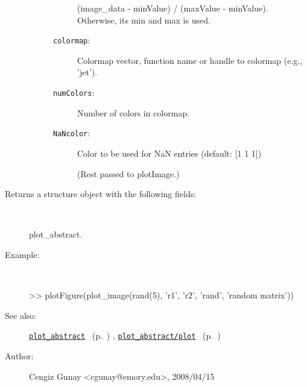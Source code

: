 \begin{description}
\begin{description}
\begin{description}
(image\_data - minValue) / (maxValue - minValue). 
Otherwise, its min and max is used.
\item[\texttt{colormap}:]
 Colormap vector, function name or handle to colormap (e.g., 'jet').
\item[\texttt{numColors}:]
 Number of colors in colormap.
\item[\texttt{NaNcolor}:]
 Color to be used for NaN entries (default: [1 1 1])

(Rest passed to plotImage.)
\end{description}%
\end{description}%
%
\item[Returns a structure object with the following fields:
]~

	plot\_abstract.
%
\item[Example:]~
\begin{lyxcode} >> plotFigure(plot\_image(rand(5), {'r1', 'r2'}, 'rand', 'random matrix'))
\\%
\end{lyxcode}
%
\item[See also:]%
\hyperlink{ref_plot_abstract}{\texttt{plot\_abstract}}%
\ (p.~\pageref{ref_plot_abstract})%
%
, \hyperlink{ref_plot_abstract__plot}{\texttt{plot\_abstract/plot}}%
\ (p.~\pageref{ref_plot_abstract__plot})%
%
%
\item[Author:]%
Cengiz Gunay <cgunay@emory.edu>, 2008/04/15
%
\end{description}
\methodline%
